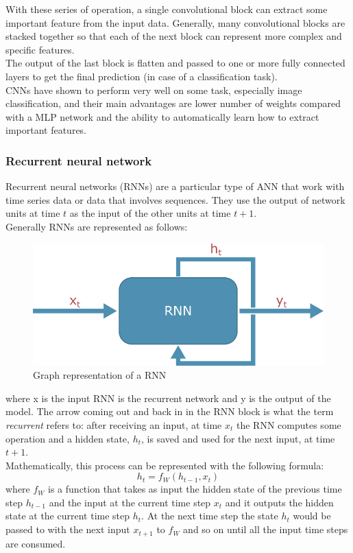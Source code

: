 With these series of operation, a single convolutional block can extract some important feature from the input data. Generally, many convolutional blocks are stacked together so that each of the next block can represent more complex and specific features. \\
The output of the last block is flatten and passed to one or more fully connected layers to get the final prediction (in case of a classification task). \\

\glspl{CNN} have shown to perform very well on some task, especially image classification, and their main advantages are lower number of  weights compared with a \gls{MLP} network and the ability to automatically learn how to extract important features.

\subsubsection{Recurrent neural network}
Recurrent neural networks (\glspl{RNN}) are a particular type of \gls{ANN} that work with time series data or data that involves sequences.  They use the output of network units at time $t$ as the input of the other units at time $t+1$. \\

Generally \glspl{RNN} are represented as follows:\\

\begin{figure}[H]
\centering
    \includegraphics[width=.45\linewidth]{images/Background/ML/RNN.pdf}
\caption[Graph representation of a recurrent neural network]{Graph representation of a \gls{RNN}}
\end{figure}

\noindent where x is the input \gls{RNN} is the recurrent network and y is the output of the model. The arrow coming out and back in in the RNN block is what the term \emph{recurrent} refers to: after receiving an input, at time $x_t$ the RNN computes some operation and a hidden state, $h_t$, is saved and used for the next input, at time $t+1$.  \\

Mathematically, this process can be represented with the following formula:
\begin{equation}
    h_t = f_W(h_{t-1},x_t)
\end{equation}
\noindent where $f_W$ is a function that takes as input the hidden state of the previous time step $h_{t-1}$ and the input at the current time step $x_t$ and it outputs the hidden state at the current time step $h_t$. At the next time step the state $h_t$ would be passed to with the next input $x_{t+1}$ to $f_W$ and so on until all the input time steps are consumed.\\

